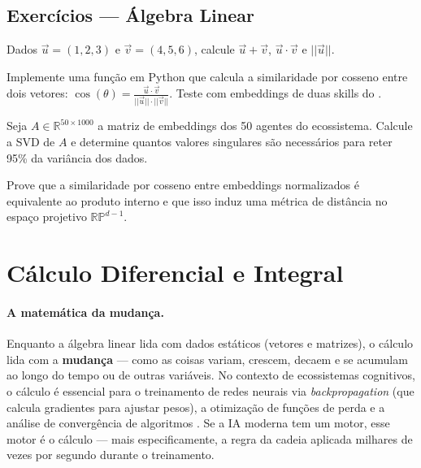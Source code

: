 \subsection{Exercícios — Álgebra Linear}

\begin{exercicio}
    Dados $\vec{u} = (1, 2, 3)$ e $\vec{v} = (4, 5, 6)$, calcule
    $\vec{u} + \vec{v}$, $\vec{u} \cdot \vec{v}$ e $||\vec{u}||$.
\end{exercicio}

\begin{exercicio}
    Implemente uma função em Python que calcula a similaridade por cosseno
    entre dois vetores: $\cos(\theta) = \frac{\vec{u} \cdot \vec{v}}
    {||\vec{u}|| \cdot ||\vec{v}||}$. Teste com embeddings de duas skills
    do \opencodeeco{}.
\end{exercicio}

\begin{exercicio}
    Seja $A \in \mathbb{R}^{50 \times 1000}$ a matriz de embeddings dos 50
    agentes do ecossistema. Calcule a SVD de $A$ e determine quantos valores
    singulares são necessários para reter 95\% da variância dos dados.
\end{exercicio}

\begin{exercicio}
    Prove que a similaridade por cosseno entre embeddings normalizados é
    equivalente ao produto interno e que isso induz uma métrica de distância
    no espaço projetivo $\mathbb{RP}^{d-1}$.
\end{exercicio}

\section{Cálculo Diferencial e Integral}
\label{sec:calculo}
\nivelintermediario

\paragraph{A matemática da mudança.} Enquanto a álgebra linear lida com
dados estáticos (vetores e matrizes), o cálculo lida com a \textbf{mudança}
--- como as coisas variam, crescem, decaem e se acumulam ao longo do tempo
ou de outras variáveis. No contexto de ecossistemas cognitivos, o cálculo é
essencial para o treinamento de redes neurais via \textit{backpropagation}
(que calcula gradientes para ajustar pesos), a otimização de funções de
perda e a análise de convergência de algoritmos
\cite{goodfellow2016deep, bishop2006pattern}. Se a IA moderna tem um motor,
esse motor é o cálculo --- mais especificamente, a regra da cadeia aplicada
milhares de vezes por segundo durante o treinamento.

